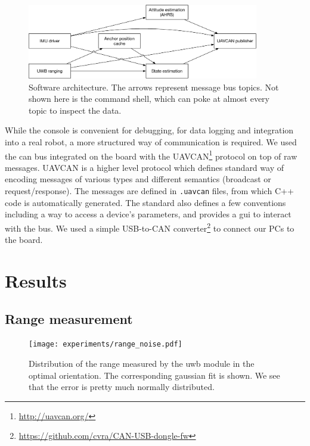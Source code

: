 \documentclass[a4paper, 12pt]{scrreprt}
\begin{document}
\begin{figure}[h]
    \centering
    \includegraphics[width=0.9\textwidth]{figures/architecture.pdf}
    \caption{Software architecture.
    The arrows represent message bus topics.
    Not shown here is the command shell, which can poke at almost every topic to inspect the data.
    }
    \label{fig:architecture}
\end{figure}

While the console is convenient for debugging, for data logging and integration into a real robot, a more structured way of communication is required.
We used the \gls{can} bus integrated on the board with the UAVCAN\footnote{\url{http://uavcan.org/}} protocol on top of raw messages.
UAVCAN is a higher level protocol which defines standard way of encoding messages of various types and different semantics (broadcast or request/response).
The messages are defined in \texttt{.uavcan} files, from which C++ code is automatically generated.
The standard also defines a few conventions including a way to access a device's parameters, and provides a \gls{gui} to interact with the bus.
We used a simple USB-to-CAN converter\footnote{\url{https://github.com/cvra/CAN-USB-dongle-fw}} to connect our PCs to the board.

\chapter{Results}

\section{Range measurement}
\label{sec:range_result}

\begin{figure}[h]
    \centering
    \texttt{[image: experiments/range\_noise.pdf]}
    \caption{Distribution of the range measured by the \gls{uwb} module in the optimal orientation.
        The corresponding gaussian fit is shown.
        We see that the error is pretty much normally distributed.
    }
    \label{fig:range_noise}
\end{figure}
\end{document}
